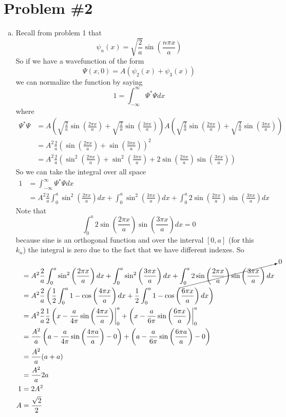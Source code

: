 \documentclass[11pt]{article}
\numberwithin{equation}{section}
\begin{document}
\section{Problem \#2}
\begin{enumerate}[(a)]
\item
Recall from problem 1 that
$$\psi_n(x) = \sqrt{\frac{2}{a}}\sin\left(\frac{n\pi x}{a}\right)$$
So if we have a wavefunction of the form 
$$\Psi(x,0) = A(\psi_2(x)+\psi_3(x))$$
we can normalize the function by saying
$$1 = \int_{-\infty}^{\infty}\Psi^*\Psi dx$$
where
\begin{align*}
\Psi^*\Psi &= A\left(\sqrt{\frac{2}{a}}\sin\left(\frac{2\pi x}{a}\right) + \sqrt{\frac{2}{a}}\sin\left(\frac{3\pi x}{a}\right)\right)A\left(\sqrt{\frac{2}{a}}\sin\left(\frac{2\pi x}{a}\right) + \sqrt{\frac{2}{a}}\sin\left(\frac{3\pi x}{a}\right)\right)\\
&= A^2\frac{2}{a}\left(\sin\left(\frac{2\pi x}{a}\right) + \sin\left(\frac{3\pi x}{a}\right)\right)^2\\
&= A^2\frac{2}{a}\left(\sin^2\left(\frac{2\pi x}{a}\right) + \sin^2\left(\frac{3\pi x}{a}\right) + 2\sin\left(\frac{2\pi x}{a}\right)\sin\left(\frac{3\pi x}{a}\right)\right)
\end{align*}
So we can take the integral over all space
\begin{align*}
1 &= \int_{-\infty}^{\infty}\Psi^*\Psi dx\\
&= A^2\frac{2}{a}\int_{0}^{a}\sin^2\left(\frac{2\pi x}{a}\right)dx + \int_{0}^{a}\sin^2\left(\frac{3\pi x}{a}\right)dx + \int_{0}^{a}2\sin\left(\frac{2\pi x}{a}\right)\sin\left(\frac{3\pi x}{a}\right)dx
\end{align*}
Note that 
$$\int_{0}^{a}2\sin\left(\frac{2\pi x}{a}\right)\sin\left(\frac{3\pi x}{a}\right)dx = 0$$
because sine is an orthogonal function and over the interval $[0,a]$ (for this $k_n$) the integral is zero due to the fact that we have different indexes. So
\begin{align*}
&= A^2\frac{2}{a}\int_{0}^{a}\sin^2\left(\frac{2\pi x}{a}\right)dx + \int_{0}^{a}\sin^2\left(\frac{3\pi x}{a}\right)dx + \cancelto{0}{\int_{0}^{a}2\sin\left(\frac{2\pi x}{a}\right)\sin\left(\frac{3\pi x}{a}\right)dx}\\
&= A^2\frac{2}{a}\left(\frac{1}{2}\int_{0}^{a}1-\cos\left(\frac{4\pi x}{a}\right)dx + \frac{1}{2}\int_{0}^{a}1-\cos\left(\frac{6\pi x}{a}\right)dx\right) \\
&= A^2\frac{2}{a}\frac{1}{2}\left(x-\frac{a}{4\pi}\sin\left(\frac{4\pi x}{a}\right)\right|_0^a + \left(x-\frac{a}{6\pi}\sin\left(\frac{6\pi x}{a}\right)\right|_0^a \\
&= \frac{A^2}{a}\left(a-\frac{a}{4\pi}\sin\left(\frac{4\pi a}{a}\right)-0\right) + \left(a-\frac{a}{6\pi}\sin\left(\frac{6\pi a}{a}\right)-0\right) \\
&= \frac{A^2}{a}(a + a) \\
&= \frac{A^2}{a}2a \\
1 &= 2A^2 \\
A &= \frac{\sqrt{2}}{2} 
\end{align*}


\end{enumerate}
\end{document}
